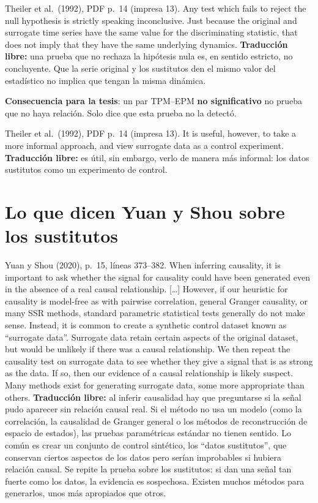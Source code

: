 \documentclass[11pt,openany]{book}
\begin{document}
\begin{cita}{Theiler et al.\ (1992), PDF p.~14 (impresa 13).}
Any test which fails to reject the null hypothesis is strictly speaking inconclusive. Just because the original and surrogate time series have the same value for the discriminating statistic, that does not imply that they have the same underlying dynamics.
\tcblower
\textbf{Traducción libre:} una prueba que no rechaza la hipótesis nula es, en sentido estricto, no concluyente. Que la serie original y los sustitutos den el mismo valor del estadístico no implica que tengan la misma dinámica.
\end{cita}

\textbf{Consecuencia para la tesis}: un par TPM--EPM \textbf{no significativo} no prueba que no haya relación. Solo dice que esta prueba no la detectó.

\begin{cita}{Theiler et al.\ (1992), PDF p.~14 (impresa 13).}
It is useful, however, to take a more informal approach, and view surrogate data as a control experiment.
\tcblower
\textbf{Traducción libre:} es útil, sin embargo, verlo de manera más informal: los datos sustitutos como un experimento de control.
\end{cita}

\section{Lo que dicen Yuan y Shou sobre los sustitutos}

\begin{cita}{Yuan y Shou (2020), p.~15, líneas 373--382.}
When inferring causality, it is important to ask whether the signal for causality could have been generated even in the absence of a real causal relationship. [\dots] However, if our heuristic for causality is model-free as with pairwise correlation, general Granger causality, or many SSR methods, standard parametric statistical tests generally do not make sense. Instead, it is common to create a synthetic control dataset known as “surrogate data”. Surrogate data retain certain aspects of the original dataset, but would be unlikely if there was a causal relationship. We then repeat the causality test on surrogate data to see whether they give a signal that is as strong as the data. If so, then our evidence of a causal relationship is likely suspect. Many methods exist for generating surrogate data, some more appropriate than others.
\tcblower
\textbf{Traducción libre:} al inferir causalidad hay que preguntarse si la señal pudo aparecer sin relación causal real. Si el método no usa un modelo (como la correlación, la causalidad de Granger general o los métodos de reconstrucción de espacio de estados), las pruebas paramétricas estándar no tienen sentido. Lo común es crear un conjunto de control sintético, los ``datos sustitutos'', que conservan ciertos aspectos de los datos pero serían improbables si hubiera relación causal. Se repite la prueba sobre los sustitutos: si dan una señal tan fuerte como los datos, la evidencia es sospechosa. Existen muchos métodos para generarlos, unos más apropiados que otros.
\end{cita}
\end{document}
